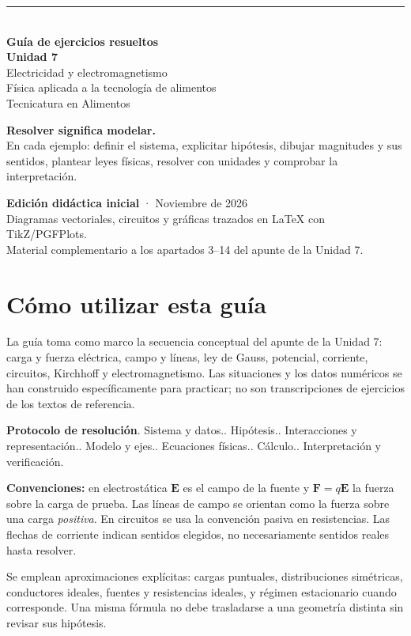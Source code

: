 \documentclass[11pt,a4paper]{article}
\newcommand{\vect}[1]{\boldsymbol{#1}}
\begin{document}
\begin{titlepage}
\vspace*{20mm}
{\color{azulf}\rule{\linewidth}{2pt}}\\[11mm]
{\Huge\bfseries Guía de ejercicios resueltos\\[4mm] Unidad 7}\\[7mm]
{\Large Electricidad y electromagnetismo}\\[15mm]
{\Large Física aplicada a la tecnología de alimentos}\\[4mm]
{\large Tecnicatura en Alimentos}\\[20mm]
\begin{tcolorbox}[colback=cielo,colframe=azul,arc=3mm,boxrule=.7pt]
\large\textbf{Resolver significa modelar.}\\[2mm]
En cada ejemplo: definir el sistema, explicitar hipótesis, dibujar magnitudes y sus sentidos, plantear leyes físicas, resolver con unidades y comprobar la interpretación.
\end{tcolorbox}
\vfill
\textbf{Edición didáctica inicial} · Noviembre de 2026\\
Diagramas vectoriales, circuitos y gráficas trazados en \LaTeX{} con TikZ/PGFPlots.\\
\textcolor{gris}{Material complementario a los apartados 3--14 del apunte de la Unidad 7.}
\end{titlepage}
\tableofcontents\clearpage
\section*{Cómo utilizar esta guía}
La guía toma como marco la secuencia conceptual del apunte de la Unidad 7: carga y fuerza eléctrica, campo y líneas, ley de Gauss, potencial, corriente, circuitos, Kirchhoff y electromagnetismo. Las situaciones y los datos numéricos se han construido específicamente para practicar; no son transcripciones de ejercicios de los textos de referencia.
\begin{metodo}
\textbf{Protocolo de resolución}. Sistema y datos.. Hipótesis.. Interacciones y representación.. Modelo y ejes.. Ecuaciones físicas.. Cálculo.. Interpretación y verificación.
\end{metodo}
\textbf{Convenciones:} en electrostática $\vect E$ es el campo de la fuente y $\vect F=q\vect E$ la fuerza sobre la carga de prueba. Las líneas de campo se orientan como la fuerza sobre una carga \emph{positiva}. En circuitos se usa la convención pasiva en resistencias. Las flechas de corriente indican sentidos elegidos, no necesariamente sentidos reales hasta resolver.
\begin{alerta}
Se emplean aproximaciones explícitas: cargas puntuales, distribuciones simétricas, conductores ideales, fuentes y resistencias ideales, y régimen estacionario cuando corresponde. Una misma fórmula no debe trasladarse a una geometría distinta sin revisar sus hipótesis.
\end{alerta}
\end{document}
